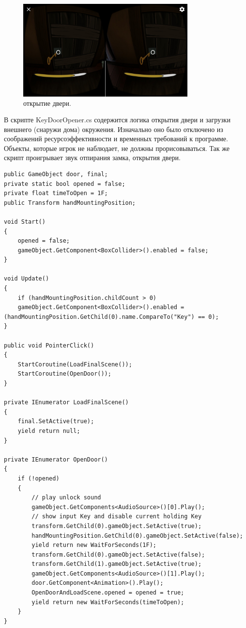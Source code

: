 \begin{figure}[h!]
    \centering
    \includegraphics[width=0.8\textwidth]{./screenshots/opening_door.jpg}
    \caption{\small{открытие двери.}}
    \label{opening_door}
\end{figure} 

В скрипте KeyDoorOpener.cs содержится логика открытия двери и загрузки внешнего (снаружи дома) окружения. Изначально оно было отключено из соображений ресурсоэффективности и временных требований к программе. Объекты, которые игрок не наблюдает, не должны прорисовываться. Так же скрипт проигрывает звук отпирания замка, открытия двери.

\begin{small}
    \begin{verbatim}
public GameObject door, final;
private static bool opened = false;
private float timeToOpen = 1F;
public Transform handMountingPosition;

void Start()
{
    opened = false;
    gameObject.GetComponent<BoxCollider>().enabled = false;
}

void Update()
{
    if (handMountingPosition.childCount > 0)
    gameObject.GetComponent<BoxCollider>().enabled = (handMountingPosition.GetChild(0).name.CompareTo("Key") == 0);
}

public void PointerClick()
{
    StartCoroutine(LoadFinalScene());
    StartCoroutine(OpenDoor());
}

private IEnumerator LoadFinalScene()
{
    final.SetActive(true);
    yield return null;
}

private IEnumerator OpenDoor()
{
    if (!opened)
    {
        // play unlock sound
        gameObject.GetComponents<AudioSource>()[0].Play();
        // show input Key and disable current holding Key
        transform.GetChild(0).gameObject.SetActive(true);
        handMountingPosition.GetChild(0).gameObject.SetActive(false);
        yield return new WaitForSeconds(1F);
        transform.GetChild(0).gameObject.SetActive(false);
        transform.GetChild(1).gameObject.SetActive(true);
        gameObject.GetComponents<AudioSource>()[1].Play();
        door.GetComponent<Animation>().Play();
        OpenDoorAndLoadScene.opened = opened = true;
        yield return new WaitForSeconds(timeToOpen);
    }
}

\end{verbatim}
\end{small}

